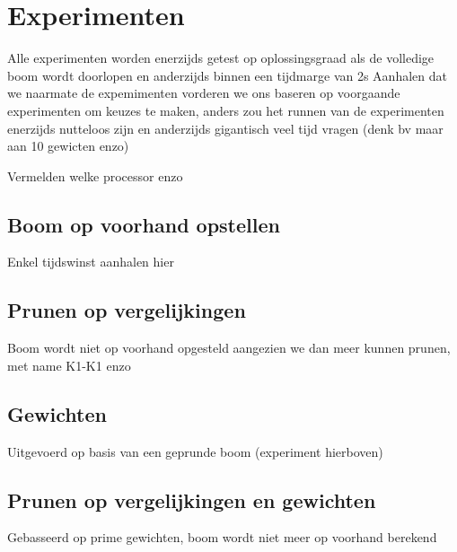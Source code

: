 \documentclass[Main.tex]{subfiles}
\begin{document}
\section{Experimenten}
Alle experimenten worden enerzijds getest op oplossingsgraad als de volledige boom wordt doorlopen en anderzijds binnen een tijdmarge van 2s
Aanhalen dat we naarmate de expemimenten vorderen we ons baseren op voorgaande experimenten om keuzes te maken, anders zou het runnen van de experimenten enerzijds nutteloos zijn en anderzijds gigantisch veel tijd vragen (denk bv maar aan 10 gewicten enzo)

Vermelden welke processor enzo
\subsection{Boom op voorhand opstellen}
Enkel tijdswinst aanhalen hier
\subsection{Prunen op vergelijkingen}
Boom wordt niet op voorhand opgesteld aangezien we dan meer kunnen prunen, met name K1-K1 enzo
\subsection{Gewichten}
Uitgevoerd op basis van een geprunde boom (experiment hierboven)
\subsection{Prunen op vergelijkingen en gewichten}
Gebasseerd op prime gewichten, boom wordt niet meer op voorhand berekend
\end{document}

